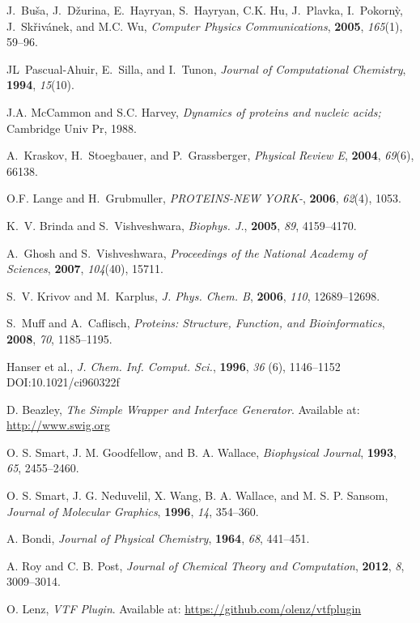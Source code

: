 \documentclass[11pt,twoside,onecolumn,a4paper,openright,notitlepage]{book}[2001/04/21]
\begin{document}
\begin{thebibliography}{10}
J.~Bu{\v{s}}a, J.~D{\v{z}}urina, E.~Hayryan, S.~Hayryan, C.K. Hu, J.~Plavka,
  I.~Pokorn{\`y}, J.~Sk{\v{r}}iv{\'a}nek, and M.C. Wu, {\em Computer Physics
  Communications}, {\bf 2005}, {\em 165}(1), 59--96.

JL~Pascual-Ahuir, E.~Silla, and I.~Tunon, {\em Journal of Computational
  Chemistry}, {\bf 1994}, {\em 15}(10).

J.A. McCammon and S.C. Harvey, {\em {Dynamics of proteins and nucleic acids};}
\newblock Cambridge Univ Pr, 1988.

A.~Kraskov, H.~Stoegbauer, and P.~Grassberger, {\em Physical Review E}, {\bf
  2004}, {\em 69}(6), 66138.

O.F. Lange and H.~Grubmuller, {\em PROTEINS-NEW YORK-}, {\bf 2006}, {\em
  62}(4), 1053.

K.~V. Brinda and S.~Vishveshwara, {\em Biophys. J.}, {\bf 2005}, {\em 89},
  4159--4170.

A.~Ghosh and S.~Vishveshwara, {\em Proceedings of the National Academy of
  Sciences}, {\bf 2007}, {\em 104}(40), 15711.

S.~V. Krivov and M.~Karplus, {\em J. Phys. Chem. B}, {\bf 2006}, {\em 110},
  12689--12698.

S.~Muff and A.~Caflisch, {\em Proteins: Structure, Function, and
  Bioinformatics}, {\bf 2008}, {\em 70}, 1185--1195.

Hanser et al., {\em J. Chem. Inf. Comput. Sci.}, {\bf 1996}, {\em 36} (6), 1146--1152 DOI:10.1021/ci960322f

D. Beazley, {\em The Simple Wrapper and Interface Generator}. Available at: \url{http://www.swig.org}

O. S. Smart, J. M. Goodfellow, and B. A. Wallace, {\em Biophysical Journal}, {\bf 1993}, {\em 65}, 2455--2460.

O. S. Smart, J. G. Neduvelil, X. Wang, B. A. Wallace, and M. S. P. Sansom, {\em Journal of Molecular Graphics}, {\bf 1996}, {\em 14}, 354--360.

A. Bondi, {\em Journal of Physical Chemistry}, {\bf 1964}, {\em 68}, 441--451.

A. Roy and C. B. Post, {\em Journal of Chemical Theory and Computation}, {\bf 2012}, {\em 8}, 3009--3014.

O. Lenz, {\em VTF Plugin}. Available at: \url{https://github.com/olenz/vtfplugin}



\end{thebibliography}

\clearpage

\end{document}
